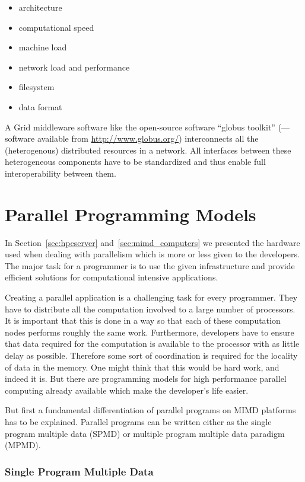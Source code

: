 \begin{itemize}
\item architecture
\item computational speed
\item machine load
\item network load and performance
\item filesystem
\item data format
\end{itemize}

A Grid middleware software like the open-source software ``globus
toolkit'' (\cite{foster97gmi}---software available from
\url{http://www.globus.org/}) interconnects all the (heterogenous)
distributed resources in a network.
All interfaces between these heterogeneous components have to be standardized
and thus enable full interoperability between them.

\section{Parallel Programming Models}
\label{sec:programming_models}

In Section~\ref{sec:hpcserver} and~\ref{sec:mimd_computers} we
presented the hardware used when dealing with parallelism which is
more or less given to the developers. The major task for a programmer
is to use the given infrastructure and provide efficient solutions for
computational intensive applications.

Creating a parallel application is a challenging task for every
programmer. They have to distribute all
the computation involved to a large number of processors. It is
important that this is done in a way so that each of these computation
nodes performs roughly the same work. Furthermore, developers have to
ensure that data required for the computation is available to the
processor with as little delay as possible. Therefore some sort of
coordination is required for the locality of data in the memory.
One might think that this would be hard work, and indeed it is. But
there are programming models for high performance parallel computing
already available which make the developer's life easier.

But first a fundamental differentiation of parallel programs on MIMD
platforms has to be explained. Parallel programs can be written either
as the single program multiple data (SPMD) or multiple program
multiple data paradigm (MPMD).

\subsubsection{Single Program Multiple Data}

